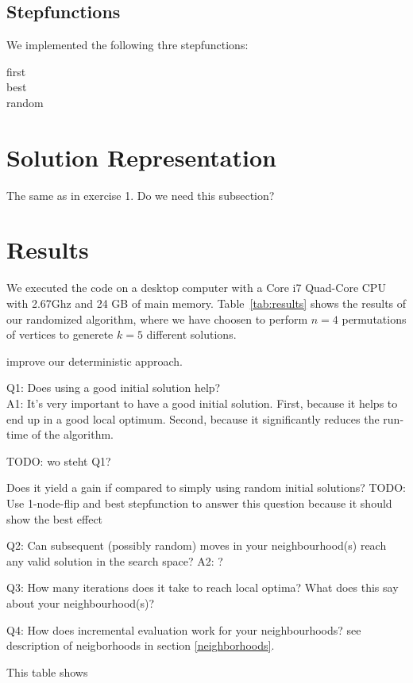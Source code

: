 \documentclass{scrartcl}
\begin{document}
\subsection{Stepfunctions}

We implemented the following thre stepfunctions:

\begin{description}
\item[first] 
\item[best] 
\item[random] 
\end{description}



\section{Solution Representation}
The same as in exercise 1. Do we need this subsection?

\section{Results}
We executed the code on a desktop computer with a Core i7 Quad-Core
CPU with 2.67Ghz and 24 GB of main memory. Table~\ref{tab:results}
shows the results of our randomized algorithm, where we have choosen
to perform $n=4$ permutations of vertices to generete $k=5$ different
solutions.


improve our deterministic approach.

Q1: Does using a good initial solution help? \\
A1: It's very important to have a good initial solution. First, because it helps to end up
in a good local optimum. Second, because it significantly reduces the run-time of the algorithm.

TODO: wo steht Q1?

Does it yield a gain if compared to simply using random initial solutions?
TODO: Use 1-node-flip and best stepfunction to answer this question because it should show the best effect


Q2: Can subsequent (possibly random) moves in your neighbourhood(s) reach
any valid solution in the search space?
A2: ?

Q3: How many iterations does it take to reach local optima? What does this say about your neighbourhood(s)?

Q4: How does incremental evaluation work for your neighbourhoods?
see description of neigborhoods in section \ref{neighborhoods}.


\begin{landscape}
\begin{table}
  \scriptsize
  
\caption{This table shows}
\label{tab:results}
\end{table}
\end{landscape}
\end{document}

